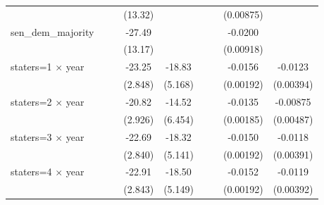 {\begin{longtable}{l*{8}{c}}
                    &                     &                     &     (13.32)         &                     &                     &                     &   (0.00875)         &                     \\
[1em]
sen\_dem\_majority    &                     &                     &      -27.49\sym{**} &                     &                     &                     &     -0.0200\sym{**} &                     \\
                    &                     &                     &     (13.17)         &                     &                     &                     &   (0.00918)         &                     \\
[1em]
staters=1 $\times$ year&                     &                     &      -23.25\sym{***}&      -18.83\sym{***}&                     &                     &     -0.0156\sym{***}&     -0.0123\sym{***}\\
                    &                     &                     &     (2.848)         &     (5.168)         &                     &                     &   (0.00192)         &   (0.00394)         \\
[1em]
staters=2 $\times$ year&                     &                     &      -20.82\sym{***}&      -14.52\sym{**} &                     &                     &     -0.0135\sym{***}&    -0.00875\sym{*}  \\
                    &                     &                     &     (2.926)         &     (6.454)         &                     &                     &   (0.00185)         &   (0.00487)         \\
[1em]
staters=3 $\times$ year&                     &                     &      -22.69\sym{***}&      -18.32\sym{***}&                     &                     &     -0.0150\sym{***}&     -0.0118\sym{***}\\
                    &                     &                     &     (2.840)         &     (5.141)         &                     &                     &   (0.00192)         &   (0.00391)         \\
[1em]
staters=4 $\times$ year&                     &                     &      -22.91\sym{***}&      -18.50\sym{***}&                     &                     &     -0.0152\sym{***}&     -0.0119\sym{***}\\
                    &                     &                     &     (2.843)         &     (5.149)         &                     &                     &   (0.00192)         &   (0.00392)         \\

\end{longtable}}
